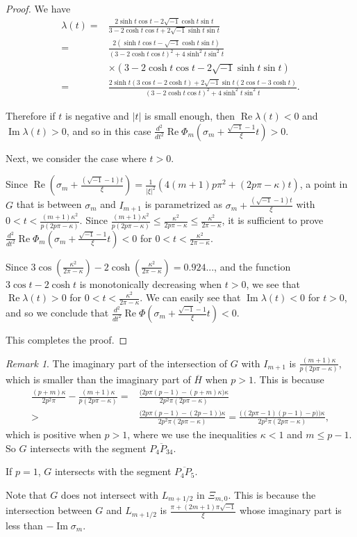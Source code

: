 \documentclass[a4paper,dvipdfmx]{amsart}
\theoremstyle{plain}
\theoremstyle{definition}
\theoremstyle{remark}
\newtheorem{rem}[thm]{Remark}
\renewcommand{\Re}{\operatorname{Re}}
\renewcommand{\Im}{\operatorname{Im}}
\renewcommand{\i}{\sqrt{-1}}
\newcommand{\saddle}{\sigma}
\numberwithin{equation}{section}
\begin{document}
\begin{proof}
We have
\begin{align*}
  \lambda(t)
  =&
  \frac{2\sinh{t}\cos{t}-2\i\cosh{t}\sin{t}}{3-2\cosh{t}\cos{t}+2\i\sinh{t}\sin{t}}
  \\
  =&
  \frac{
  2(\sinh{t}\cos{t}-\i\cosh{t}\sin{t})}{(3-2\cosh{t}\cos{t})^2+4\sinh^2{t}\sin^2{t}}
  \\
  &\times
  (3-2\cosh{t}\cos{t}-2\i\sinh{t}\sin{t})
  \\
  =&
  \frac{2\sinh{t}(3\cos{t}-2\cosh{t})+2\i\sin{t}(2\cos{t}-3\cosh{t})}
       {(3-2\cosh{t}\cos{t})^2+4\sinh^2{t}\sin^2{t}}.
\end{align*}
\par
Therefore if $t$ is negative and $|t|$ is small enough, then $\Re\lambda(t)<0$ and $\Im\lambda(t)>0$, and so in this case $\frac{d^2}{dt^2}\Re\Phi_m\left(\saddle_m+\frac{\i-1}{\xi}t\right)>0$.
\par
Next, we consider the case where $t>0$.
\par
Since $\Re\left(\saddle_m+\frac{(\i-1)t}{\xi}\right)=\frac{1}{|\xi|^2}(4(m+1)p\pi^2+(2p\pi-\kappa)t)$, a point in $G$ that is between $\saddle_m$ and $I_{m+1}$ is parametrized as $\saddle_m+\frac{(\i-1)t}{\xi}$ with $0<t<\frac{(m+1)\kappa^2}{p(2p\pi-\kappa)}$.
Since $\frac{(m+1)\kappa^2}{p(2p\pi-\kappa)}\le\frac{\kappa^2}{2p\pi-\kappa}\le\frac{\kappa^2}{2\pi-\kappa}$, it is sufficient to prove $\frac{d^2}{dt^2}\Re\Phi_m\left(\saddle_m+\frac{\i-1}{\xi}t\right)<0$ for $0<t<\frac{\kappa^2}{2\pi-\kappa}$.
\par
Since $3\cos\left(\frac{\kappa^2}{2\pi-\kappa}\right)-2\cosh\left(\frac{\kappa^2}{2\pi-\kappa}\right)=0.924...$, and the function $3\cos{t}-2\cosh{t}$ is monotonically decreasing when $t>0$, we see that $\Re\lambda(t)>0$ for $0<t<\frac{\kappa^2}{2\pi-\kappa}$.
We can easily see that $\Im\lambda(t)<0$ for $t>0$, and so we conclude that $\frac{d^2}{dt^2}\Re\Phi\left(\saddle_m+\frac{\i-1}{\xi}t\right)<0$.
\par
This completes the proof.
\end{proof}
\begin{rem}\label{rem:G}
The imaginary part of the intersection of $G$ with $I_{m+1}$ is $\frac{(m+1)\kappa}{p(2p\pi-\kappa)}$, which is smaller than the imaginary part of $\overline{H}$ when $p>1$.
This is because
\begin{align*}
  \frac{(p+m)\kappa}{2p^2\pi}
  -
  \frac{(m+1)\kappa}{p(2p\pi-\kappa)}
  =&
  \frac{\bigl(2p\pi(p-1)-(p+m)\kappa\bigr)\kappa}{2p^2\pi(2p\pi-\kappa)}
  \\
  >&
  \frac{\bigl(2p\pi(p-1)-(2p-1)\bigr)\kappa}{2p^2\pi(2p\pi-\kappa)}
  =
  \frac{\bigl((2p\pi-1)(p-1)-p)\bigr)\kappa}{2p^2\pi(2p\pi-\kappa)},
\end{align*}
which is positive when $p>1$, where we use the inequalities $\kappa<1$ and $m\le p-1$.
So $G$ intersects with the segment $\overline{P_4P_{34}}$.
\par
If $p=1$, $G$ intersects with the segment $\overline{P_4P_5}$.
\par
Note that $G$ does not intersect with $L_{m+1/2}$ in $\Xi_{m,0}$.
This is because the intersection between $G$ and $L_{m+1/2}$ is $\frac{\pi+(2m+1)\pi\i}{\xi}$ whose imaginary part is less than $-\Im\saddle_m$.
\end{rem}
\end{document}
